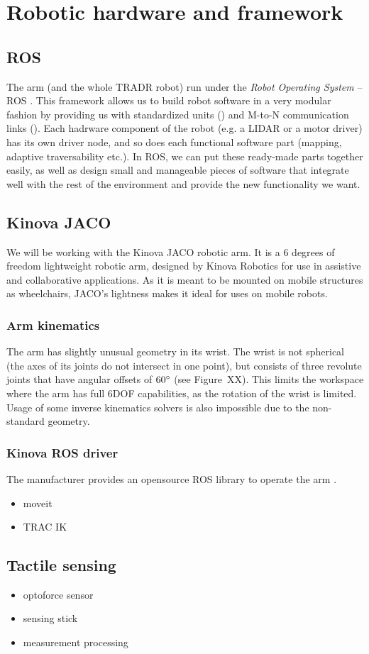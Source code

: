 \documentclass[buriama8_dp.tex]{subfiles}
\begin{document}
\chapter{Robotic hardware and framework}

\section{ROS}
\label{sec:ros}

The arm (and the whole TRADR robot) run under the \emph{Robot Operating System} – ROS \cite{ros_paper}. This framework allows us to build robot software in a very modular fashion by providing us with standardized units () and M-to-N communication links (). Each hadrware component of the robot (e.g. a LIDAR or a motor driver) has its own driver node, and so does each functional software part (mapping, adaptive traversability etc.). In ROS, we can put these ready-made parts together easily, as well as design small and manageable pieces of software that integrate well with the rest of the environment and provide the new functionality we want.



\section{Kinova JACO}
We will be working with the Kinova JACO robotic arm. It is a 6 degrees of freedom lightweight robotic arm, designed by Kinova Robotics for use in assistive and collaborative applications. As it is meant to be mounted on mobile structures as wheelchairs, JACO's lightness makes it ideal for uses on mobile robots.

\subsection{Arm kinematics}
\label{subsec:arm_kinematics}

The arm has slightly unusual geometry in its wrist. The wrist is not spherical (the axes of its joints do not intersect in one point), but consists of three revolute joints that have angular offsets of \(60^\circ\) (see Figure~XX). This limits the workspace where the arm has full 6DOF capabilities, as the rotation of the wrist is limited. Usage of some inverse kinematics solvers is also impossible due to the non-standard geometry.

\subsection{Kinova ROS driver}
\label{subsec:kinova_ros}

The manufacturer provides an opensource ROS library to operate the arm \cite{kinova_ros}. 


\begin{itemize}
\item moveit
\item TRAC IK
\end{itemize}

\section{Tactile sensing}

\begin{itemize}
\item optoforce sensor
\item sensing stick
\item measurement processing
\end{itemize}
\end{document}
